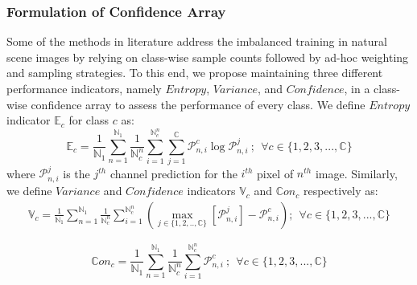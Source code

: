 \documentclass[runningheads]{llncs}
\begin{document}
\subsubsection{Formulation of Confidence Array}\label{confidence-array}
Some of the methods in literature \cite{li2020overcoming,hu2021adaptive} address the imbalanced training in natural scene images by relying on class-wise sample counts followed by ad-hoc weighting and sampling strategies. To this end, we propose maintaining three different performance indicators, namely $Entropy$, $Variance$, and $Confidence$, in a class-wise confidence array to assess the performance of every class. We define $Entropy$ indicator $\mathbb{E}_c$ for class $c$ as:
\begin{equation}
    \mathbb{E}_c = \frac{1}{\mathbb{N}_1}\sum\limits_{n=1}^{\mathbb{N}_1} \frac{1}{\mathbb{N}_c^n}\sum\limits_{i=1}^{\mathbb{N}_c^n}\sum\limits_{j=1}^\mathbb{C} \mathcal{P}_{n,i}^{c}\log \mathcal{P}_{n,i}^{j}\:; \:\: \forall c\in\{1,2,3,...,\mathbb{C}\}
\end{equation}
where $\mathcal{P}_{n,i}^j$ is the $j^{th}$ channel prediction for the $i^{th}$ pixel of $n^{th}$ image. Similarly, we define $Variance$ and $Confidence$ indicators $\mathbb{V}_c$ and $\mathbb{C}on_c$ respectively as:
\begin{equation}
\begin{split}
    \mathbb{V}_c = \frac{1}{\mathbb{N}_1}\sum\limits_{n=1}^{\mathbb{N}_1} \frac{1}{\mathbb{N}_c^n}\sum\limits_{i=1}^{\mathbb{N}_c^n}\left( \max\limits_{j\in \{1,2,..,\mathbb{C} \}}[\mathcal{P}_{n,i}^{j}] - \mathcal{P}_{n,i}^{c}  \right);\:\:
    \forall c\in\{1,2,3,...,\mathbb{C}\}
\end{split}
\end{equation}

\begin{equation}
    \mathbb{C}on_c = \frac{1}{\mathbb{N}_1}\sum\limits_{n=1}^{\mathbb{N}_1} \frac{1}{\mathbb{N}_c^n}\sum\limits_{i=1}^{\mathbb{N}_c^n} \mathcal{P}_{n,i}^{c} \:; \:\: \forall c\in\{1,2,3,...,\mathbb{C}\}
\end{equation}
\end{document}
